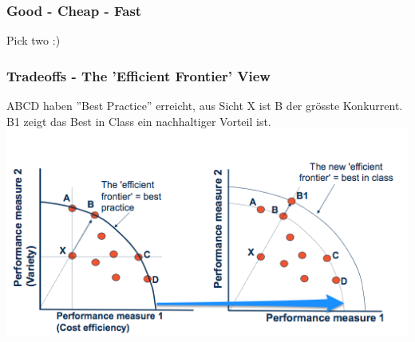 \subsubsection{Good - Cheap - Fast}
Pick two :)
\subsubsection{Tradeoffs - The 'Efficient Frontier'  View}
ABCD haben ''Best Practice'' erreicht, aus Sicht X ist B der gr\"osste Konkurrent.
B1 zeigt das Best in Class ein nachhaltiger Vorteil ist.\\
\includegraphics[width=1\textwidth]{W02/efficient_frontier}
